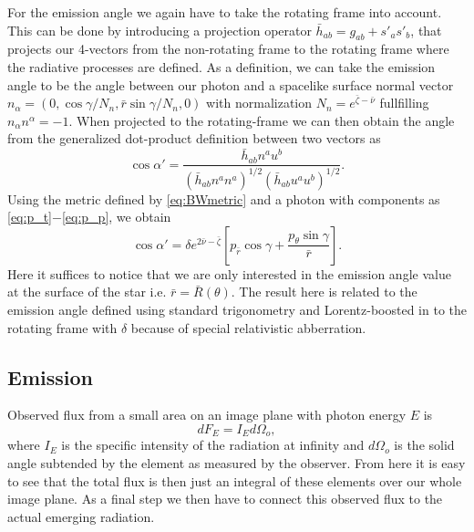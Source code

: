 \documentclass[iop, usenatbib]{emulateapj}
\newcommand{\be}{\begin{equation}}
\newcommand{\ee}{\end{equation}}
\newcommand{\rb}{\ensuremath{\bar{r}}}
\newcommand{\nub}{\ensuremath{\bar{\nu}}}
\newcommand{\zetab}{\ensuremath{\bar{\zeta}}}
\begin{document}
For the emission angle we again have to take the rotating frame into account.
This can be done by introducing a projection operator $\bar{h}_{ab} = g_{ab} + s'_a s'_b$, that projects our 4-vectors from the non-rotating frame to the rotating frame where the radiative processes are defined.
As a definition, we can take the emission angle to be the angle between our photon and a spacelike surface normal vector $n_{\alpha} = (0, \cos\gamma/N_n, \rb \sin\gamma/N_n, 0)$ with normalization $N_n = e^{\zetab - \nub}$ fullfilling $n_{\alpha}n^{\alpha} = -1$.
When projected to the rotating-frame we can then obtain the angle from the generalized dot-product definition between two vectors as
\be\label{eq:gen_angle}
\cos\alpha' = \frac{\bar{h}_{ab}n^a u^b}{(\bar{h}_{ab} n^a n^a)^{1/2} (\bar{h}_{ab} u^a u^b)^{1/2}}.
\ee
Using the metric defined by \eqref{eq:BWmetric} and a photon with components as \eqref{eq:p_t}$-$\eqref{eq:p_p}, we obtain
\be
\cos\alpha' = \delta e^{2\nub-\zetab} \left[ p_{\rb} \cos\gamma + \frac{p_{\theta} \sin\gamma}{\rb} \right].
\ee
Here it suffices to notice that we are only interested in the emission angle value at the surface of the star i.e. $\rb = \bar{R}(\theta)$.
The result here is related to the emission angle defined using standard trigonometry \citep[see e.g.][]{PB06} and Lorentz-boosted in to the rotating frame with $\delta$ because of special relativistic abberration.


\subsection{Emission}
Observed flux from a small area on an image plane with photon energy $E$ is
\be
dF_E = I_E d\Omega_o,
\ee
where $I_E$ is the specific intensity of the radiation at infinity and $d\Omega_o$ is the solid angle subtended by the element as measured by the observer.
From here it is easy to see that the total flux is then just an integral of these elements over our whole image plane.
As a final step we then have to connect this observed flux to the actual emerging radiation.
\end{document}
